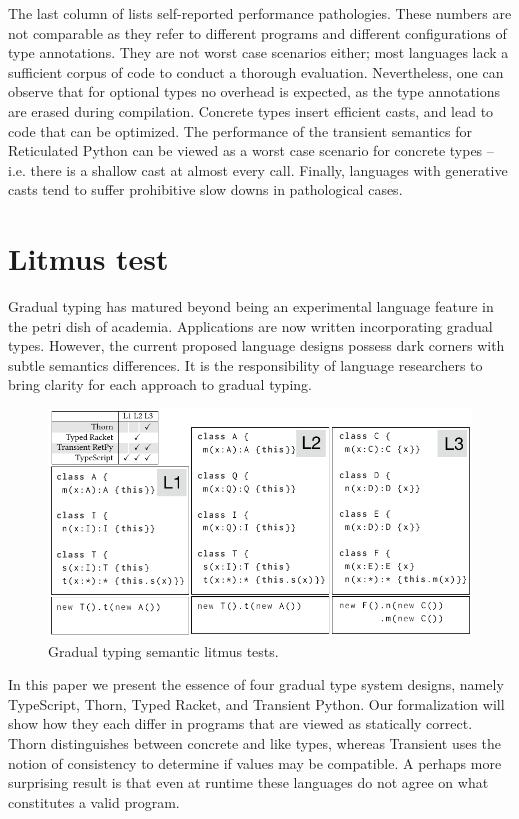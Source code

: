 \documentclass[acmsmall, anonymous, authordraft, review]{acmart} %
\begin{document}
The last column of  lists self-reported performance pathologies.
These numbers are not comparable as they refer to different programs and
different configurations of type annotations. They are not worst case scenarios
either; most languages lack a sufficient corpus of code to conduct a thorough
evaluation.  Nevertheless, one can observe that for optional types no overhead
is expected, as the type annotations are erased during compilation. Concrete
types insert efficient casts, and lead to code that can be optimized.  The
performance of the transient semantics for Reticulated Python can be viewed as a
worst case scenario for concrete types -- i.e. there is a shallow cast at almost
every call. Finally, languages with generative casts tend to suffer prohibitive
slow downs in pathological cases.


\section{Litmus test}\label{litmustests}

\noindent
Gradual typing has matured beyond being an experimental language feature in
the petri dish of academia. Applications are now written incorporating gradual types.  
However, the current proposed language designs possess dark corners with
subtle semantics differences. It is the responsibility of language researchers 
to bring clarity for each approach to gradual typing.

\begin{figure}
	\vspace{-.4cm}
	\includegraphics[width=.7\columnwidth]{../figures/litm}
	\caption{Gradual typing semantic litmus tests.}\label{litmus}
\end{figure}

\noindent In this paper we present the essence of four gradual type
system designs, namely TypeScript, Thorn, Typed Racket, and Transient Python.
Our formalization will show how they each differ in programs that are viewed as
statically correct. Thorn distinguishes between concrete and like types,
whereas Transient uses the notion of consistency to determine if values may be
compatible. A perhaps more surprising result is that even at runtime these
languages do not agree on what constitutes a valid program. 
\end{document}
